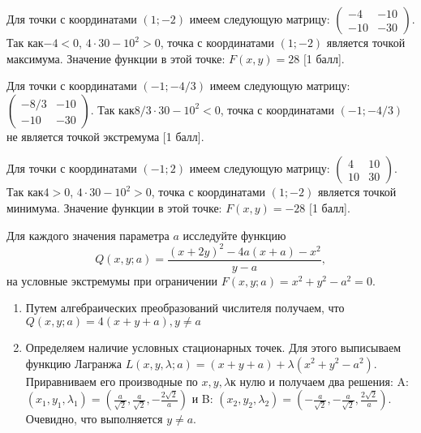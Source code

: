 \documentclass[addpoints, answers]{exam} %
\begin{document}
\begin{questions}
\begin{solution}
Для точки с координатами $\left(1;-2\right)$ имеем следующую матрицу: $\left(\begin{array}{cc} {-4} & {-10} \\ {-10} & {-30} \end{array}\right)$. Так как$-4<0$, $4\cdot 30-10^{2} >0$, точка с координатами $\left(1;-2\right)$ является точкой максимума. Значение функции в этой точке: $F(x,y)=28$ $[$1 балл].

Для точки с координатами $\left(-1;-4/3\right)$ имеем следующую матрицу: $\left(\begin{array}{cc} {-8/3} & {-10} \\ {-10} & {-30} \end{array}\right)$. Так как$8/3\cdot 30-10^{2} <0$, точка с координатами $\left(-1;-4/3\right)$ не является точкой экстремума $[$1 балл].

Для точки с координатами $\left(-1;2\right)$ имеем следующую матрицу: $\left(\begin{array}{cc} {4} & {10} \\ {10} & {30} \end{array}\right)$. Так как$4>0$, $4\cdot 30-10^{2} >0$, точка с координатами $\left(1;-2\right)$ является точкой минимума. Значение функции в этой точке: $F(x,y)=-28$ $[$1 балл].
\end{solution}


\question[10] Для каждого значения параметра $a$ исследуйте функцию
\[
Q(x,y;a)=\frac{(x+2y)^2-4a(x+a)-x^2}{y-a},
\]
на условные экстремумы при ограничении $F(x,y;a)=x^2+y^2-a^2=0$.


\begin{solution}

\begin{enumerate}
\item  Путем алгебраических преобразований числителя получаем, что $Q\left(x,y;a\right)=4\left(x+y+a\right),y\ne a$

\item  Определяем наличие условных стационарных точек. Для этого выписываем функцию Лагранжа $L\left(x,y,\lambda ;a\right)=\left(x+y+a\right)+\lambda \left(x^{2} +y^{2} -a^{2} \right)$. Приравниваем его производные по $x,y,\lambda $к нулю и получаем два решения: A: $\left(x_{1} ,y_{1} ,\lambda _{1} \right)=\left(\frac{a}{\sqrt{2} } ,\frac{a}{\sqrt{2} } ,-\frac{2\sqrt{2} }{a} \right)$ и B: $\left(x_{2} ,y_{2} ,\lambda _{2} \right)=\left(-\frac{a}{\sqrt{2} } ,-\frac{a}{\sqrt{2} } ,\frac{2\sqrt{2} }{a} \right)$. Очевидно, что выполняется $y\ne a$.


\end{enumerate}
\end{solution}
\end{questions}
\end{document}
